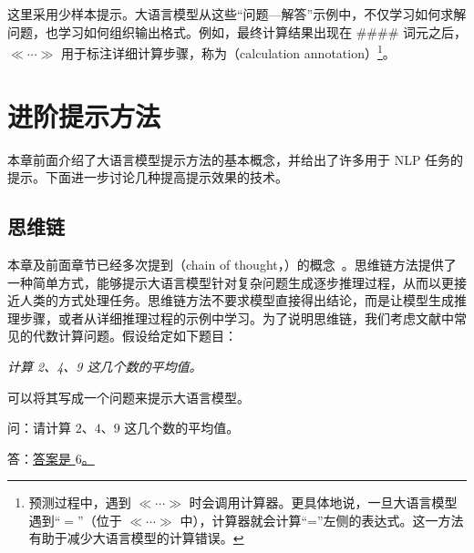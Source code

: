 \noindent 这里采用少样本提示。大语言模型从这些“问题—解答”示例中，不仅学习如何求解问题，也学习如何组织输出格式。例如，最终计算结果出现在 \#\#\#\# 词元之后，$\ll \cdots \gg$ 用于标注详细计算步骤，称为（calculation annotation）\footnote{预测过程中，遇到 $\ll \cdots \gg$ 时会调用计算器。更具体地说，一旦大语言模型遇到“$=$”（位于 $\ll \cdots \gg$ 中），计算器就会计算“=”左侧的表达式。这一方法有助于减少大语言模型的计算错误。}。


\section{进阶提示方法}
\label{sec:advanced-prompting}

\noindent 本章前面介绍了大语言模型提示方法的基本概念，并给出了许多用于 NLP 任务的提示。下面进一步讨论几种提高提示效果的技术。

\subsection{思维链}
\label{sec:chain-of-thought}

\noindent 本章及前面章节已经多次提到（chain of thought，）的概念~\cite{wei-etal:2022chain,chowdhery-etal:2022palm}。思维链方法提供了一种简单方式，能够提示大语言模型针对复杂问题生成逐步推理过程，从而以更接近人类的方式处理任务。思维链方法不要求模型直接得出结论，而是让模型生成推理步骤，或者从详细推理过程的示例中学习。为了说明思维链，我们考虑文献中常见的代数计算问题。假设给定如下题目：

\vspace{0.8em}

\hspace{5em} \textit{计算 2、4、9 这几个数的平均值。}

\vspace{0.8em}

\noindent 可以将其写成一个问题来提示大语言模型。

\vspace{0.5em}
\begin{tcolorbox}

\begingroup
\setlength{\leftskip}{2em}
\setlength{\rightskip}{2em}

问：请计算 $2$、$4$、$9$ 这几个数的平均值。

\vspace{0.3em}

答：\underline{答案是 $6$。}

\endgroup

\end{tcolorbox}
\vspace{0.5em}

